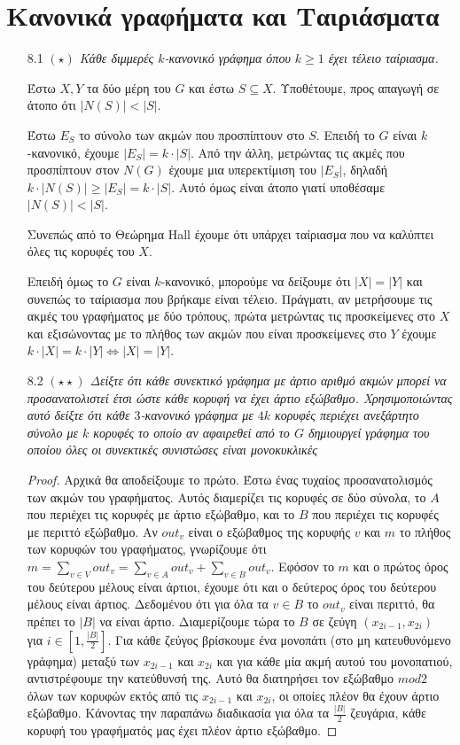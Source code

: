 \documentclass[a4paper, oneside, 11pt]{article}
\theoremstyle{definition}
\begin{document}
\section{Κανονικά γραφήματα και Ταιριάσματα}
\begin{enumerate}
   \item[8.1] \emph{$(\star)$ Κάθε διμμερές $k$-κανονικό γράφημα όπου
   $k \geq 1$ έχει τέλειο ταίριασμα.}

   Έστω $X, Y$ τα δύο μέρη του $G$ και έστω $S \subseteq X$. Υποθέτουμε,
   προς απαγωγή σε άτοπο ότι $|N(S)| < |S|$. 

   Έστω $E_S$ το σύνολο των ακμών που προσπίπτουν στο $S$.
   Επειδή το $G$ είναι $k$-κανονικό, έχουμε
   $|E_S| = k \cdot |S|$. Από την άλλη, μετρώντας τις
   ακμές που προσπίπτουν στον $N(G)$ έχουμε μια υπερεκτίμιση
   του $|E_S|$, δηλαδή $k \cdot |N(S)| \geq |E_S| = k \cdot |S|$.
   Αυτό όμως είναι άτοπο γιατί υποθέσαμε $|N(S)| < |S|$.

   Συνεπώς από το Θεώρημα Hall έχουμε ότι υπάρχει ταίριασμα που
   να καλύπτει όλες τις κορυφές του $X$.

   Επειδή όμως το $G$ είναι $k$-κανονικό, μπορούμε να δείξουμε ότι
   $|X|=|Y|$ και συνεπώς το ταίριασμα που βρήκαμε είναι τέλειο.
   Πράγματι, αν μετρήσουμε τις ακμές του γραφήματος με δύο τρόπους,
   πρώτα μετρώντας τις προσκείμενες στο $X$ και εξισώνοντας με
   το πλήθος των ακμών που είναι προσκείμενες στο $Y$ έχουμε
   $k \cdot |X| = k \cdot |Y| \Leftrightarrow |X| = |Y|$.

	\item[8.2] \emph{$(\star\star)$ Δείξτε ότι κάθε συνεκτικό γράφημα με άρτιο αριθμό ακμών μπορεί να προσανατολιστεί έτσι ώστε κάθε κορυφή να έχει άρτιο εξώβαθμο.
Χρησιμοποιώντας αυτό δείξτε ότι κάθε $3$-κανονικό γράφημα με $4k$ κορυφές περιέχει ανεξάρτητο σύνολο με $k$ κορυφές το οποίο αν αφαιρεθεί από το $G$ δημιουργεί γράφημα
του οποίου όλες οι συνεκτικές συνιστώσες είναι μονοκυκλικές}

\begin{proof}
Αρχικά θα αποδείξουμε το πρώτο. Έστω ένας τυχαίος προσανατολισμός των ακμών του γραφήματος. Αυτός διαμερίζει τις κορυφές σε δύο σύνολα, το $A$ που περιέχει τις κορυφές με άρτιο
εξώβαθμο, και το $B$ που περιέχει τις κορυφές με περιττό εξώβαθμο. Αν $out_v$ είναι ο εξώβαθμος της κορυφής $v$ και $m$ το πλήθος των κορυφών του γραφήματος, 
γνωρίζουμε ότι $m=\sum_{v\in V} out_v = \sum_{v\in A} out_v + \sum_{v\in B} out_v$. Εφόσον το $m$ και ο πρώτος όρος του δεύτερου μέλους είναι άρτιοι, έχουμε ότι και ο δεύτερος όρος του δεύτερου
μέλους είναι άρτιος. Δεδομένου ότι για όλα τα $v\in B$ το $out_v$ είναι περιττό, θα πρέπει το $|B|$ να είναι άρτιο. Διαμερίζουμε τώρα το $B$ σε ζεύγη $(x_{2i-1},x_{2i})$ για $i\in [1,\frac{|B|}{2}]$.
Για κάθε ζεύγος βρίσκουμε ένα μονοπάτι (στο μη κατευθυνόμενο γράφημα) μεταξύ των $x_{2i-1}$ και $x_{2i}$ και για κάθε μία ακμή αυτού του μονοπατιού, αντιστρέφουμε την κατεύθυνσή της. Αυτό θα διατηρήσει
τον εξώβαθμο $mod 2$ όλων των κορυφών εκτός από τις $x_{2i-1}$ και $x_{2i}$, οι οποίες πλέον θα έχουν άρτιο εξώβαθμο. Κάνοντας την παραπάνω διαδικασία για όλα τα $\frac{|B|}{2}$ ζευγάρια, κάθε κορυφή
του γραφήματός μας έχει πλέον άρτιο εξώβαθμο.
\end{proof}


\end{enumerate}
\end{document}
